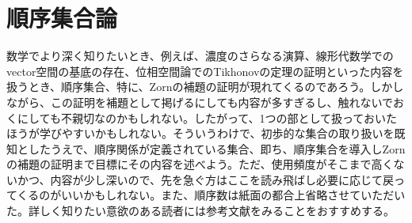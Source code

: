 \documentclass[a4paper]{jsarticle}
\begin{document}
\section{順序集合論}
数学でより深く知りたいとき、例えば、濃度のさらなる演算、線形代数学でのvector空間の基底の存在、位相空間論でのTikhonovの定理の証明といった内容を扱うとき、順序集合、特に、Zornの補題の証明が現れてくるのであろう。しかしながら、この証明を補題として掲げるにしても内容が多すぎるし、触れないでおくにしても不親切なのかもしれない。したがって、1つの部として扱っておいたほうが学びやすいかもしれない。そういうわけで、初歩的な集合の取り扱いを既知としたうえで、順序関係が定義されている集合、即ち、順序集合を導入しZornの補題の証明まで目標にその内容を述べよう。ただ、使用頻度がそこまで高くないかつ、内容が少し深いので、先を急ぐ方はここを読み飛ばし必要に応じて戻ってくるのがいいかもしれない。また、順序数は紙面の都合上省略させていただいた。詳しく知りたい意欲のある読者には参考文献をみることをおすすめする。
\end{document}
